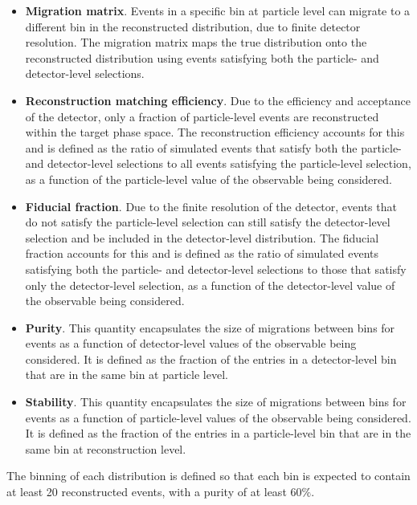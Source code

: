 \documentclass[atlasdraft=false, cernpreprint, UKenglish, texmf, orcidlogo]{atlasdoc}
\begin{document}
\begin{itemize}
\item \textbf{Migration matrix}. Events in a specific bin at particle level can migrate to a different bin in
the reconstructed distribution, due to finite detector resolution. The migration matrix maps the true distribution onto the
reconstructed distribution using events satisfying both the particle- and detector-level
selections.
 
\item \textbf{Reconstruction matching efficiency}. Due to the efficiency and acceptance of the detector, only a fraction of particle-level
events are reconstructed within the target phase space. The reconstruction efficiency accounts for this
and is defined as the ratio of simulated events that satisfy both the particle- and detector-level selections to all events satisfying the
particle-level selection, as a function of the particle-level value of the observable being considered.
 
\item \textbf{Fiducial fraction}. Due to the finite resolution of the detector, events that do not satisfy the particle-level selection can still satisfy
the detector-level selection and be included in the detector-level distribution. The fiducial fraction accounts for
this and is defined as the ratio of simulated events satisfying both the particle- and detector-level selections
to those that satisfy only the detector-level selection, as a function of the detector-level value of the observable being considered.
 
\item \textbf{Purity}. This quantity encapsulates the size of migrations between bins for events as a function of detector-level values of
the observable being considered. It is defined as the fraction of the entries in a detector-level bin that are in the same bin at particle level.
 
\item \textbf{Stability}. This quantity encapsulates the size of migrations between bins for events as a function of particle-level values of
the observable being considered. It is defined as the fraction of the entries in a particle-level bin that are in the same bin at reconstruction level.
\end{itemize}
 
The binning of each distribution is defined so that each bin is expected to contain at least 20 reconstructed events, with a purity of at
least 60$\%$.
 
\end{document}
